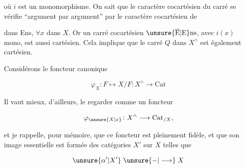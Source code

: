 
où $i$ est un monomorphisme. On sait que le caractère cocartésien du carré se vérifie ``argument par argument'' par le caractère cocartésien de


dans Ens, $\forall x$ dans $X$. Or un  carré cocartésien  $\unsure{\overline{\mathrm E}|\mathrm E}\mathrm{ns}$, avec $i(x)$ mono, est aussi cartésien. Cela implique que le carré $Q$ dans $X^\wedge$ est également cartésien.

Considérons  le foncteur canonique

\[
\varphi_X\colon F\longmapsto X/F\colon X^\wedge\longrightarrow\mathrm{Cat}
\]

Il vaut mieux, d'ailleurs, le regarder comme un foncteur

\[
\varphi_{\unsure{X|x}}\colon X^\wedge\longrightarrow\mathrm{Cat}_{/X},
\]

et je rappelle, pour mémoire, que ce foncteur est pleinement fidèle, et que son image essentielle est formée des catégories $X'$ sur $X$ telles que

\[
\unsure{\alpha'|X'}\mathrel{\unsure{-|\longrightarrow}}X
\]

